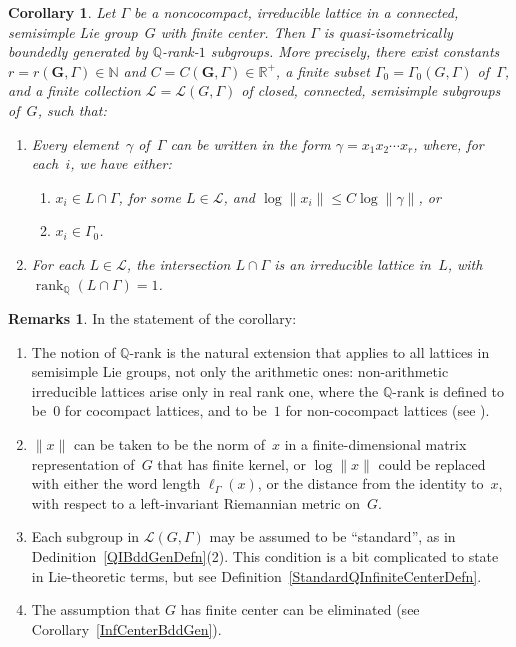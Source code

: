\documentclass[11pt]{article}
\numberwithin{equation}{section}
\newcommand{\NN}{\mathbb{N}}
\newcommand{\QQ}{\mathbb{Q}}
\newcommand{\RR}{\mathbb{R}}
\newcommand{\Ga}{\mathbf{G}}
\DeclareMathOperator{\rank}{rank}
\newcommand{\subgroups}{\mathcal{L}}
\numberwithin{equation}{section}
\newtheorem{cor}[thm]{Corollary}
\theoremstyle{definition}
\newtheorem{rems}[thm]{Remarks}
\begin{document}
\begin{cor} \label{QIBddGenLie}
Let $\Gamma$ be a noncocompact, irreducible lattice in a connected, semisimple Lie group~$G$ with finite center. Then $\Gamma$ is quasi-isometrically boundedly generated by $\QQ$-rank-$1$ subgroups. More precisely, there exist constants $r = r(\Ga,\Gamma) \in \NN$ and $C = C(\Ga,\Gamma) \in \RR^+$, a finite subset $\Gamma_0 = \Gamma_0(G,\Gamma)$ of~$\Gamma$, and a finite collection $\subgroups = \subgroups(G,\Gamma)$ of closed, connected, semisimple subgroups of~$G$, such that:
	\begin{enumerate}\itemsep=0pt
\item[$1.$] %
	 Every element~$\gamma$ of~$\Gamma$ can be written in the form $\gamma = x_1 x_2 \cdots x_r$, where, for each~$i$, we have either:
\begin{enumerate}\itemsep=0pt
\item[$(a)$] %
		$x_i \in L \cap \Gamma$, for some $L \in \subgroups$, and $\log \|x_i\| \le C \log \|\gamma\|$,
		or
\item[$(b)$] $x_i \in \Gamma_0$.
		\end{enumerate}
\item[$2.$] For each $L \in \subgroups$, the intersection $L \cap \Gamma$ is an irreducible lattice in~$L$, with $\rank_\QQ (L \cap \Gamma) = 1$.

	\end{enumerate}
\end{cor}

\begin{rems}
In the statement of the corollary:
\begin{enumerate}\itemsep=0pt
	\item The notion of $\QQ$-rank is the natural extension that applies to all lattices in semisimple Lie groups, not only the arithmetic ones: non-arithmetic irreducible lattices arise only in real rank one, where the $\QQ$-rank is defined to be~$0$ for cocompact lattices, and to be~$1$ for non-cocompact lattices (see \cite[Definition~9.1.8, pp.~193--194]{Morris-IntroArithGrps}).
	\item $\| x \|$ can be taken to be the norm of~$x$ in a finite-dimensional matrix representation of~$G$ that has finite kernel, or $\log \|x\|$ could be replaced with either the word length $\ell_\Gamma(x)$, or the distance from the identity to~$x$, with respect to a left-invariant Riemannian metric on~$G$.
	\item Each subgroup in $\subgroups(G,\Gamma)$ may be assumed to be ``standard'', as in Dedinition~\ref{QIBddGenDefn}(2). This condition is a bit complicated to state in Lie-theoretic terms, but see Definition~\ref{StandardQInfiniteCenterDefn}.
	\item The assumption that $G$ has finite center can be eliminated (see Corollary~\ref{InfCenterBddGen}).
	\end{enumerate}
\end{rems}
\end{document}
